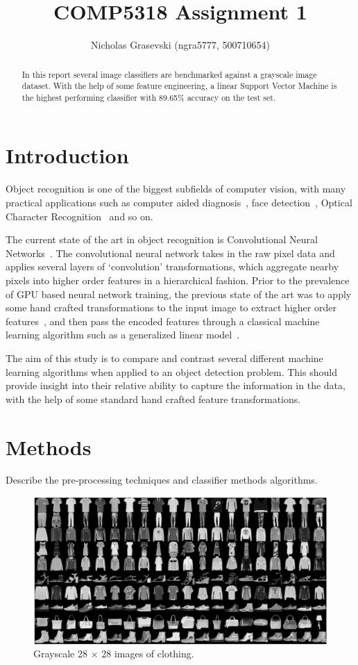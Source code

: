 \documentclass[landscape,twocolumn]{article}
\title{COMP5318 Assignment 1}
\author{Nicholas Grasevski (ngra5777, 500710654)}
\begin{document}
\maketitle
\begin{abstract}
In this report several image classifiers are benchmarked against a grayscale image dataset. With the help of some feature engineering, a linear Support Vector Machine is the highest performing classifier with 89.65\% accuracy on the test set.
\end{abstract}

\section{Introduction}
Object recognition is one of the biggest subfields of computer vision, with many practical applications such as computer aided diagnosis~\cite{doi2007computer}, face detection~\cite{hjelmaas2001face}, Optical Character Recognition~\cite{mori1999optical} and so on.

The current state of the art in object recognition is Convolutional Neural Networks~\cite{iandola2016squeezenet}. The convolutional neural network takes in the raw pixel data and applies several layers of `convolution' transformations, which aggregate nearby pixels into higher order features in a hierarchical fashion. Prior to the prevalence of GPU based neural network training, the previous state of the art was to apply some hand crafted transformations to the input image to extract higher order features~\cite{rybski2010visual}, and then pass the encoded features through a classical machine learning algorithm such as a generalized linear model~\cite{ebrahimzadeh2014efficient}.

The aim of this study is to compare and contrast several different machine learning algorithms when applied to an object detection problem. This should provide insight into their relative ability to capture the information in the data, with the help of some standard hand crafted feature transformations.

\section{Methods}
Describe the pre-processing techniques and classifier methods algorithms.

\begin{figure}[ht]
\includegraphics[width=\linewidth]{../Dataset_image}
\caption{Grayscale 28 $\times$ 28 images of clothing.}\label{fig:images}
\end{figure}
\end{document}
